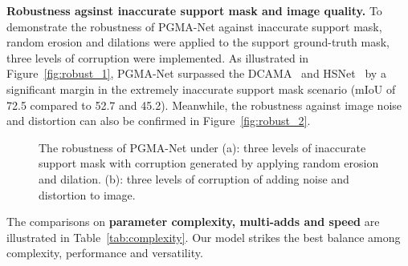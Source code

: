 \documentclass[lettersize,journal]{IEEEtran}
\begin{document}
\textbf{Robustness agsinst inaccurate support mask and image quality.}
To demonstrate the robustness of PGMA-Net against inaccurate support mask, random erosion and dilations were applied to the support ground-truth mask, three levels of corruption were implemented. As illustrated in Figure~\ref{fig:robust_1}, PGMA-Net surpassed the DCAMA~\cite{shi2022dense} and HSNet~\cite{min2021hypercorrelation} by a significant margin in the extremely inaccurate support mask scenario (mIoU of 72.5 compared to 52.7 and 45.2). Meanwhile, the robustness against image noise and distortion can also be confirmed in Figure~\ref{fig:robust_2}.

\begin{figure}[htbp]
  \centering
  \hspace{0.01\textwidth}
  \caption{The robustness of PGMA-Net under (a): three levels of inaccurate support mask with corruption generated by applying random erosion and dilation. (b): three levels of corruption of adding noise and distortion to image.}
  \label{fig:robustness}
\end{figure}


The comparisons on \textbf{parameter complexity, multi-adds and speed} are illustrated in Table~\ref{tab:complexity}. Our model strikes the best balance among complexity, performance and versatility.



\begin{table}[h]
  \centering
  \caption{Comparison on parameter complexity, multi-adds and speed. PGMA-Net-lite is a variant of PGMA-Net that without using high-order affinities.}
  \label{tab:complexity}
\end{table}
\end{document}
